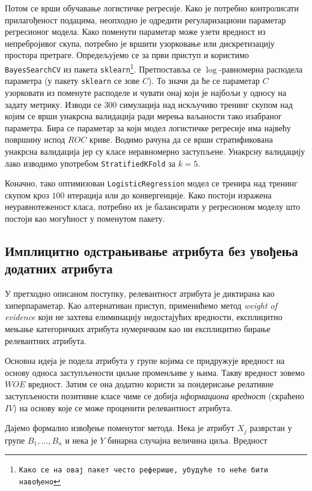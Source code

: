 \documentclass[12pt, a4paper]{article}
\begin{document}
		Потом се врши обучавање логистичке регресије. Како је потребно контролисати прилагођеност подацима, неопходно је одредити регуларизациони параметар регресионог модела. Како поменути параметар може узети вредност из непребројивог скупа, потребно је вршити узорковање или дискретизацију простора претраге. Опредељујемо се за први приступ и користимо \texttt{BayesSearchCV} из пакета \texttt{sklearn\footnote{Како се на овај пакет често реферише, убудуће то неће бити навођено}}. Претпоставља се $\log$-равномерна расподела параметра (у пакету \texttt{sklearn} се зове $C$). То значи да ће се параметар $C$ узорковати из поменуте расподеле и чувати онај који је најбољи у односу на задату метрику. Изводи се $300$ симулација над искључиво тренинг скупом над којим се врши унакрсна валидација ради мерења ваљаности тако изабраног параметра. Бира се параметар за који модел логистичке регресије има највећу површину испод $ROC$ криве. Водимо рачуна да се врши стратификована унакрсна валидација јер су класе неравномерно заступљене. Унакрсну валидацију лако изводимо употребом \texttt{StratifiedKFold} за $k=5$.
	
		Коначно, тако оптимизован \texttt{LogisticRegression} модел се тренира над тренинг скупом кроз $100$ итерација или до конвергенције. Како постоји изражена неуравнотеженост класа, потребно их је балансирати у регресионом моделу што постоји као могућност у поменутом пакету.
	
	\subsection{Имплицитно одстрањивање атрибута без увођења додатних атрибута}
		У претходно описаном поступку, релевантност атрибута је диктирана као хиперпараметар. Као алтернативан приступ, применићемо метод \textit{weight of evidence} који не захтева елиминацију недостајућих вредности, експлицитно мењање категоричких атрибута нумеричким као ни експлицитно бирање релевантних атрибута.
		
		Основна идеја је подела атрибута у групе којима се придружује вредност на основу односа заступљености циљне променљиве у њима. Такву вредност зовемо $WOE$ вредност. Затим се она додатно користи за пондерисање релативне заступљености позитивне класе чиме се добија \textit{нформациона вредност} (скраћено $IV$) на основу које се може проценити релевантност атрибута.
		
		Дајемо формално извођење поменутог метода. Нека је атрибут $X_j$ разврстан у групе $B_1, ..., B_n$ и нека је $Y$ бинарна случајна величина циља. Вредност
		
\end{document}
